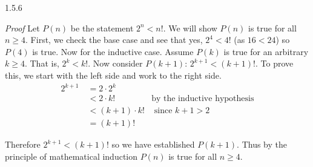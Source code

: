 \documentclass[11pt,]{book}
\makeatletter
\theoremstyle{ptxplainnotitle}
\theoremstyle{ptxplaintitle}
\renewcommand*{\proofname}{Proof}
\renewenvironment{proof}[1][\proofname]{\par
  \pushQED{\qed}%
  \normalfont \topsep6\p@\@plus6\p@\relax
  \trivlist
  \item\relax
    {\itshape
    #1\@addpunct{.}}\hspace\labelsep\ignorespaces
}{%
  \popQED\endtrivlist\@endpefalse
}
\theoremstyle{ptxdefinitionnotitle}
\theoremstyle{ptxdefinitiontitle}
\theoremstyle{ptxdefinitionnotitle}
\theoremstyle{ptxdefinitiontitle}
\theoremstyle{ptxdefinitionnotitle}
\theoremstyle{ptxdefinitiontitle}
\theoremstyle{ptxdefinitiontitlenonumber}
\theoremstyle{ptxdefinitiontitlenonumber}
\numberwithin{equation}{chapter}
\newcommand{\lt}{<}
\newcommand{\gt}{>}
\newcommand{\amp}{&}
\makeatother
\begin{document}
\begin{divisionexercise}{1.5.6}
\textbf{}\begin{proof}\hypertarget{proof-9}{}
\hypertarget{p-608}{}%
Let \(P(n)\) be the statement \(2^n \lt  n!\). We will show \(P(n)\) is true for all \(n \ge 4\). First, we check the base case and see that yes, \(2^4 \lt  4!\) (as \(16 \lt  24\)) so \(P(4)\) is true. Now for the inductive case. Assume \(P(k)\) is true for an arbitrary \(k \ge 4\). That is, \(2^k \lt  k!\). Now consider \(P(k+1)\): \(2^{k+1} \lt  (k+1)!\). To prove this, we start with the left side and work to the right side.%
\begin{align*}
2^{k+1}~ \amp = 2\cdot 2^k \amp\\
\amp \lt 2\cdot k! \amp \text{by the inductive hypothesis}\\
\amp \lt (k+1) \cdot k! \amp \text{ since } k+1 \gt 2\\
\amp = (k+1)! \amp
\end{align*}
%
\par
\hypertarget{p-609}{}%
Therefore \(2^{k+1} \lt  (k+1)!\) so we have established \(P(k+1)\). Thus by the principle of mathematical induction \(P(n)\) is true for all \(n \ge 4\).%
\end{proof}
\end{divisionexercise}%
\end{document}
